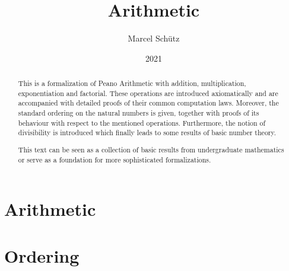 \documentclass{article}
\title{Arithmetic}
\author{Marcel Schütz}
\date{2021}
\begin{document}
  \maketitle

  \begin{abstract}
    This is a formalization of Peano Arithmetic with addition, multiplication,
    exponentiation and factorial.
    These operations are introduced axiomatically and are accompanied with
    detailed proofs of their common computation laws.
    Moreover, the standard ordering on the natural numbers is given, together
    with proofs of its behaviour with respect to the mentioned operations.
    Furthermore, the notion of divisibility is introduced which finally leads
    to some results of basic number theory.

    This text can be seen as a collection of basic results from undergraduate
    mathematics or serve as a foundation for more sophisticated formalizations.
  \end{abstract}

  \tableofcontents

  \newpage
  \part{Arithmetic}

  

  

  

  

  


  \newpage
  \part{Ordering}

  

  

  

  

  
\end{document}
